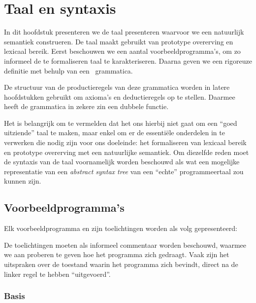 
\chapter{Taal en syntaxis}

In dit hoofdstuk presenteren we de taal presenteren waarvoor we een natuurlijk semantiek construeren. De taal maakt gebruikt van prototype overerving en lexicaal bereik. Eerst beschouwen we een aantal voorbeeldprogramma's, om zo informeel de te formaliseren taal te karakteriseren. Daarna geven we een rigoreuze definitie met behulp van een \BNF\ grammatica.

De structuur van de productieregels van deze grammatica worden in latere hoofdstukken gebruikt om axioma's en deductieregels op te stellen. Daarmee heeft de grammatica in zekere zin een dubbele functie.

Het is belangrijk om te vermelden dat het ons hierbij niet gaat om een ``goed uitziende'' taal te maken, maar enkel om er de essentiële onderdelen in te verwerken die nodig zijn voor ons doeleinde: het formaliseren van lexicaal bereik en prototype overerving met een natuurlijke semantiek. Om diezelfde reden moet de syntaxis van de taal voornamelijk worden beschouwd als wat een mogelijke representatie van een \emph{abstract syntax tree} van een ``echte'' programmeertaal zou kunnen zijn.

\section{Voorbeeldprogramma's}
\label{sec:voorbeelden}

Elk voorbeeldprogramma en zijn toelichtingen worden als volg gepresenteerd:

\codeFragmentCaption
{}

De toelichtingen moeten als informeel commentaar worden beschouwd, waarmee we aan proberen te geven hoe het programma zich gedraagt. Vaak zijn het uitspraken over de toestand waarin het programma zich bevindt, direct na de linker regel te hebben ``uitgevoerd''.

\subsection{Basis}

